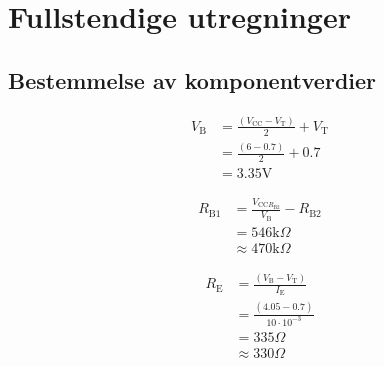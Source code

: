 \appendix
\section{Fullstendige utregninger}\label{ax:math}

\subsection{Bestemmelse av komponentverdier}


\begin{equation}
    \begin{split}
         V_\text{B} &= \frac{(V_{\text{CC}}-V_\text{T})}{2}+V_\text{T} \\
         &= \frac{(6-0.7)}{2}+0.7 \\
         &= 3.35\text{V}
    \end{split}
\end{equation}


\begin{equation}
    \begin{split}
        R_{\text{B}1} &= \frac{V_{\text{CC}R_{\text{B}2}}}{V_\text{B}}-R_{\text{B}2} \\
        &= 546\text{k}\Omega \\
        &\approx 470\text{k}\Omega
    \end{split}
\end{equation}


\begin{equation}
    \begin{split}
        R_\text{E} &= \frac{(V_\text{B}-V_\text{T})}{I_\text{E}} \\
        &= \frac{(4.05-0.7)}{10\cdot10^{-3}} \\
        &= 335\Omega \\
        &\approx 330\Omega
    \end{split}
\end{equation}
